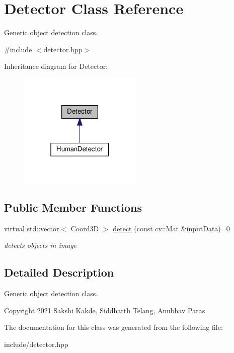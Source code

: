 \hypertarget{classDetector}{}\section{Detector Class Reference}
\label{classDetector}


Generic object detection class.  




{\ttfamily \#include $<$detector.\+hpp$>$}



Inheritance diagram for Detector\+:
\nopagebreak
\begin{figure}[H]
\begin{center}
\leavevmode
\includegraphics[width=166pt]{classDetector__inherit__graph}
\end{center}
\end{figure}
\subsection*{Public Member Functions}
\begin{DoxyCompactItemize}
\item 
\mbox{\label{classDetector_a70a59ddd18ef4015a74d158e7d70aba4}} 
virtual std\+::vector$<$ Coord3D $>$ \hyperlink{classDetector_a70a59ddd18ef4015a74d158e7d70aba4}{detect} (const cv\+::\+Mat \&input\+Data)=0
\begin{DoxyCompactList}\small\item\em detects objects in image \end{DoxyCompactList}\end{DoxyCompactItemize}


\subsection{Detailed Description}
Generic object detection class. 

Copyright 2021 Sakshi Kakde, Siddharth Telang, Anubhav Paras 

The documentation for this class was generated from the following file\+:\begin{DoxyCompactItemize}
\item 
include/detector.\+hpp\end{DoxyCompactItemize}

